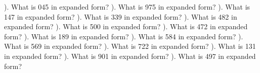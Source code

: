 \documentclass{article}%
\begin{document}
). What is 045 in expanded form?%
\newline%
\newline%
). What is 975 in expanded form?%
\newline%
\newline%
). What is 147 in expanded form?%
\newline%
\newline%
). What is 339 in expanded form?%
\newline%
\newline%
). What is 482 in expanded form?%
\newline%
\newline%
). What is 500 in expanded form?%
\newline%
\newline%
). What is 472 in expanded form?%
\newline%
\newline%
). What is 189 in expanded form?%
\newline%
\newline%
). What is 584 in expanded form?%
\newline%
\newline%
). What is 569 in expanded form?%
\newline%
\newline%
). What is 722 in expanded form?%
\newline%
\newline%
). What is 131 in expanded form?%
\newline%
\newline%
). What is 901 in expanded form?%
\newline%
\newline%
). What is 497 in expanded form?%
\newline%
\newline%
\end{document}
